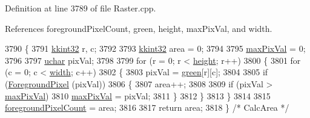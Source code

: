 Definition at line 3789 of file Raster.\+cpp.



References foreground\+Pixel\+Count, green, height, max\+Pix\+Val, and width.


\begin{DoxyCode}
3790 \{
3791   \hyperlink{namespace_k_k_b_a8fa4952cc84fda1de4bec1fbdd8d5b1b}{kkint32}  r, c;
3792 
3793   \hyperlink{namespace_k_k_b_a8fa4952cc84fda1de4bec1fbdd8d5b1b}{kkint32}  area = 0;
3794 
3795   \hyperlink{class_k_k_b_1_1_raster_a4f37d3b83826f522f61af0918a1d5546}{maxPixVal} = 0;
3796 
3797   \hyperlink{namespace_k_k_b_ace9969169bf514f9ee6185186949cdf7}{uchar}  pixVal;
3798 
3799   \textcolor{keywordflow}{for}  (r = 0; r < \hyperlink{class_k_k_b_1_1_raster_af39ff189de4fbb6de98392e187efafb7}{height}; r++)
3800   \{
3801     \textcolor{keywordflow}{for}  (c = 0; c < \hyperlink{class_k_k_b_1_1_raster_ae0bcc103e191c3421d7692dc69ceb554}{width}; c++)
3802     \{
3803       pixVal = \hyperlink{class_k_k_b_1_1_raster_a2d2238911145488e226cd2e34fc8448c}{green}[r][c];
3804       
3805       \textcolor{keywordflow}{if}  (\hyperlink{class_k_k_b_1_1_raster_aa1e1363589e719eb64f0957281b84b6a}{ForegroundPixel} (pixVal))
3806       \{
3807         area++;
3808 
3809         \textcolor{keywordflow}{if}  (pixVal > \hyperlink{class_k_k_b_1_1_raster_a4f37d3b83826f522f61af0918a1d5546}{maxPixVal})
3810           \hyperlink{class_k_k_b_1_1_raster_a4f37d3b83826f522f61af0918a1d5546}{maxPixVal} = pixVal;
3811       \}
3812     \}
3813   \}
3814 
3815   \hyperlink{class_k_k_b_1_1_raster_aa7e86253f4b9c347da718732e44b60e8}{foregroundPixelCount} = area;
3816 
3817   \textcolor{keywordflow}{return}  area;
3818 \}  \textcolor{comment}{/* CalcArea */}
\end{DoxyCode}
